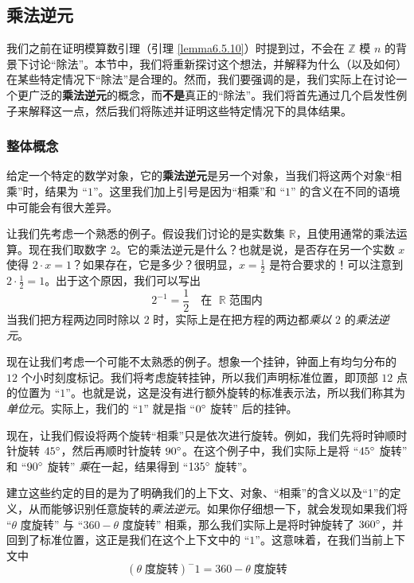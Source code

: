 
\subsection{乘法逆元}\label{sec:section6.5.3}

我们之前在证明模算数引理（引理 \ref{lemma6.5.10}）时提到过，不会在 $\mathbb{Z}$ 模 $n$ 的背景下讨论``除法''。本节中，我们将重新探讨这个想法，并解释为什么（以及如何）在某些特定情况下``除法''是合理的。然而，我们要强调的是，我们实际上在讨论一个更广泛的\textbf{乘法逆元}的概念，而\textbf{不是}真正的``除法''。我们将首先通过几个启发性例子来解释这一点，然后我们将陈述并证明这些特定情况下的具体结果。

\subsubsection*{整体概念}

给定一个特定的数学对象，它的\textbf{乘法逆元}是另一个对象，当我们将这两个对象``相乘''时，结果为 ``$1$''。这里我们加上引号是因为``相乘''和 ``$1$'' 的含义在不同的语境中可能会有很大差异。\\

\begin{example}
    让我们先考虑一个熟悉的例子。假设我们讨论的是实数集 $\mathbb{R}$，且使用通常的乘法运算。现在我们取数字 $2$。它的乘法逆元是什么？也就是说，是否存在另一个实数 $x$ 使得 $2 \cdot x = 1$？如果存在，它是多少？很明显，$x = \frac{1}{2}$ 是符合要求的！可以注意到 $2 \cdot \frac{1}{2} = 1$。出于这个原因，我们可以写出
    \[2^{-1} = \frac{1}{2} \quad \text{在 }\; \mathbb{R} \;\text{范围内}\]
    当我们把方程两边同时除以 $2$ 时，实际上是在把方程的两边都\emph{乘以} $2$ 的\emph{乘法逆元}。
\end{example}

\begin{example}
    现在让我们考虑一个可能不太熟悉的例子。想象一个挂钟，钟面上有均匀分布的 $12$ 个小时刻度标记。我们将考虑旋转挂钟，所以我们声明标准位置，即顶部 $12$ 点的位置为 ``$1$''。也就是说，这是没有进行额外旋转的标准表示法，所以我们称其为\emph{单位元}。实际上，我们的 ``$1$'' 就是指 ``$0 ^\circ$ 旋转'' 后的挂钟。

    现在，让我们假设将两个旋转``相乘''只是依次进行旋转。例如，我们先将时钟顺时针旋转 $45 ^\circ$，然后再顺时针旋转 $90 ^\circ$。在这个例子中，我们实际上是将 ``$45 ^\circ$ 旋转'' 和 ``$90 ^\circ$ 旋转'' \emph{乘}在一起，结果得到 ``$135 ^\circ$ 旋转''。

    建立这些约定的目的是为了明确我们的上下文、对象、``相乘''的含义以及``1''的定义，从而能够识别任意旋转的\emph{乘法逆元}。如果你仔细想一下，就会发现如果我们将 ``$\theta$ 度旋转'' 与 ``$360-\theta$ 度旋转'' 相乘，那么我们实际上是将时钟旋转了 $360 ^\circ$，并回到了标准位置，这正是我们在这个上下文中的 ``$1$''。这意味着，在我们当前上下文中
    \[(\theta \;\text{度旋转})^-1 = 360-\theta \;\text{度旋转}\]
\end{example}

